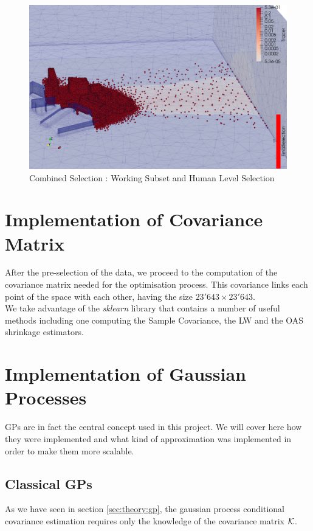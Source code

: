\begin{figure}[h!]
\centering
	\includegraphics[width = 0.8 \linewidth]{figures/Subset/FinalSelection_zoom}
	\caption{Combined Selection : Working Subset and Human Level Selection}
	\label{fig:combined_selection}
\end{figure}


\section{Implementation of Covariance Matrix}

After the pre-selection of the data, we proceed to the computation of the covariance matrix needed for the optimisation process. This covariance links each point of the space with each other, having the size $23'643 \times 23'643 $.\\

We take advantage of the \textit{sklearn} library that contains a number of useful methods including one computing the Sample Covariance, the LW and the OAS shrinkage estimators. \\



\section{Implementation of Gaussian Processes}

GPs are in fact the central concept used in this project. We will cover here how they were implemented and what kind of approximation was implemented in order to make them more scalable. 

\subsection{Classical GPs}

As we have seen in section \ref{sec:theory:gp}, the gaussian process conditional covariance estimation requires only the knowledge of the covariance matrix $\mathcal{K}$. 

